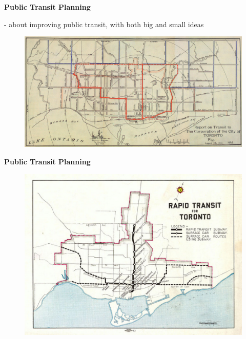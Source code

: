 \documentclass[aspectratio=169]{beamer}
\begin{document}
\begin{frame}
	
	\textbf{Public Transit Planning}
	
	- about improving public transit, with both big and small ideas

		\begin{figure}
			\centering
			\includegraphics[width=0.9\linewidth]{images/toronto_plan_1910.png}
		\end{figure}
	
\end{frame}



\begin{frame}
	
	\textbf{Public Transit Planning}
	
	
	\begin{figure}
		\centering
		\includegraphics[width=0.8\linewidth]{images/toronto_plan_1945.png}
	\end{figure}
		
\end{frame}
\end{document}
